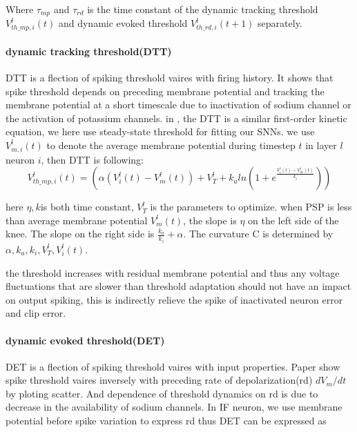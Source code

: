 \documentclass{article}
\begin{document}
Where $\tau_{mp}$ and $\tau_{rd}$ is the time constant of the dynamic tracking threshold $V_{th\_mp,i}^l(t)$ and dynamic evoked threshold $V_{th\_rd,i}^l(t+1)$ separately.

\paragraph{dynamic tracking threshold(DTT)} DTT is a flection of spiking threshold vaires with firing history. It shows that spike threshold depends on preceding membrane potential
and tracking the membrane potential at a short timescale due to inactivation of sodium channel\cite{kuba2010presynaptic, hu2009distinct, platkiewicz2011impact} or the activation of potassium channels\cite{higgs2011kv1, goldberg2008k}.
in \cite{fontaine2014spike}, the DTT is a similar first-order kinetic equation, we here use steady-state threshold for fitting our SNNs.
we use $V_{m,i}^l(t)$ to denote the average membrane potential during timestep $t$ in layer $l$ neuron $i$, then DTT is following:
\begin{equation}
  V_{th\_mp,i}^l(t) = \left(\alpha\left(V_i^l(t)-V_m^l(t)\right)+V_{T}^l+k_aln\left(1+e^{\frac{V_i^l(t)-V_m^l(t)}{k_i}}\right)\right)
\end{equation}

here $\eta, k$is both time constant, $V_{T}^l$ is the parameters to optimize. when PSP is less than average membrane potential $V_m^l(t)$, the slope is $\eta$ on the left side of the knee. The slope on the right side is $\frac{k_a}{k_i} + \alpha$. The curvature C is determined by $\alpha, k_a, k_i, V_{T}^l, V_i^l(t)$.


the threshold increases with residual membrane potential and thus any voltage fluctuations that are slower than threshold adaptation should not have an impact on output spiking, this is indirectly relieve the spike of inactivated neuron error and clip error.

\paragraph{dynamic evoked threshold(DET)} DET is a flection of spiking threshold vaires with input properties. 
Paper\cite{azouz2000dynamic} show spike threshold vaires inversely with preceding rate of depolarization(rd) $dV_m/dt$ by ploting scatter. And dependence of threshold dynamics on rd is due to 
decrease in the availability of sodium channels. In IF neuron, we use membrane potential before spike variation to express rd thus DET can be expressed as
\end{document}
